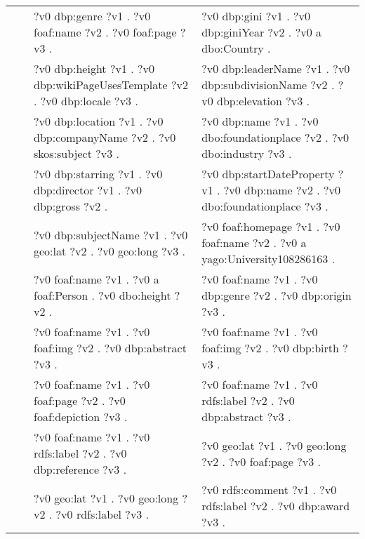 \begin{table}
{\begin{tabular}{!{\color{white}\vrule}l!{\color{white}\vrule}c@{\hs}!{\color{white}\vrule}p{11.5cm}!{\color{white}\vrule}p{11.5cm}!{\color{white}\vrule}}
			 &  \phantom{a} &     ?v0 dbp:genre ?v1 .  ?v0 foaf:name ?v2 .  ?v0 foaf:page ?v3 . &  ?v0 dbp:gini ?v1 .  ?v0 dbp:giniYear ?v2 .  ?v0 a dbo:Country . \\
			 &  \phantom{a} &     ?v0 dbp:height ?v1 .  ?v0 dbp:wikiPageUsesTemplate ?v2 .  ?v0 dbp:locale ?v3 . &  ?v0 dbp:leaderName ?v1 .  ?v0 dbp:subdivisionName ?v2 .  ?v0 dbp:elevation ?v3 . \\
			 &  \phantom{a} &     ?v0 dbp:location ?v1 .  ?v0 dbp:companyName ?v2 .  ?v0 skos:subject ?v3 . &  ?v0 dbp:name ?v1 .  ?v0 dbo:foundationplace ?v2 .  ?v0 dbo:industry ?v3 . \\
			 &  \phantom{a} &     ?v0 dbp:starring ?v1 .  ?v0 dbp:director ?v1 .  ?v0 dbp:gross ?v2 . &  ?v0 dbp:startDateProperty ?v1 .  ?v0 dbp:name ?v2 .  ?v0 dbo:foundationplace ?v3 . \\
			 &  \phantom{a} &     ?v0 dbp:subjectName ?v1 .  ?v0 geo:lat ?v2 .  ?v0 geo:long ?v3 . &  ?v0 foaf:homepage ?v1 .  ?v0 foaf:name ?v2 .  ?v0 a yago:University108286163 . \\
			 &  \phantom{a} &     ?v0 foaf:name ?v1 .  ?v0 a foaf:Person .  ?v0 dbo:height ?v2 . &  ?v0 foaf:name ?v1 .  ?v0 dbp:genre ?v2 .  ?v0 dbp:origin ?v3 . \\
			 &  \phantom{a} &     ?v0 foaf:name ?v1 .  ?v0 foaf:img ?v2 .  ?v0 dbp:abstract ?v3 . &  ?v0 foaf:name ?v1 .  ?v0 foaf:img ?v2 .  ?v0 dbp:birth ?v3 . \\
			 &  \phantom{a} &     ?v0 foaf:name ?v1 .  ?v0 foaf:page ?v2 .  ?v0 foaf:depiction ?v3 . &  ?v0 foaf:name ?v1 .  ?v0 rdfs:label ?v2 .  ?v0 dbp:abstract ?v3 . \\
			 &  \phantom{a} &     ?v0 foaf:name ?v1 .  ?v0 rdfs:label ?v2 .  ?v0 dbp:reference ?v3 . &  ?v0 geo:lat ?v1 .  ?v0 geo:long ?v2 .  ?v0 foaf:page ?v3 . \\
			 &  \phantom{a} &     ?v0 geo:lat ?v1 .  ?v0 geo:long ?v2 .  ?v0 rdfs:label ?v3 . &  ?v0 rdfs:comment ?v1 .  ?v0 rdfs:label ?v2 .  ?v0 dbp:award ?v3 . \\

\end{tabular}}
\end{table}
